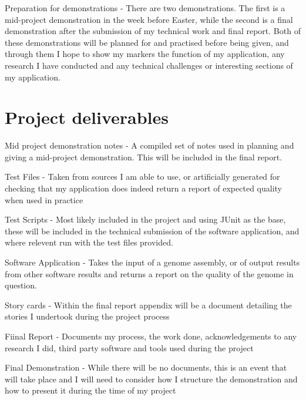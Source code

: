 \documentclass[11pt,fleqn,twoside]{article}
\begin{document}
Preparation for demonstrations - There are two demonstrations. The first is a mid-project demonstration in the week before Easter, while the second is a final demonstration after the submission of my technical work and final report. Both of these demonstrations will be planned for and practised before being given, and through them I hope to show my markers the function of my application, any research I have conducted and any technical challenges or interesting sections of my application. 

\section{Project deliverables}

Mid project demonstration notes - A compiled set of notes used in planning and giving a mid-project demonstration. This will be included in the final report.

Test Files - Taken from sources I am able to use, or artificially generated for checking that my application does indeed return a report of expected quality when used in practice

Test Scripts - Most likely included in the project and using JUnit as the base, these will be included in the technical submission of the software application, and where relevent run with the test files provided.

Software Application - Takes the input of a genome assembly, or of output results from other software results and returns a report on the quality of the genome in question.

Story cards - Within the final report appendix will be a document detailing the stories I undertook during the project process

Fiinal Report -  Documents my process, the work done, acknowledgements to any research I did, third party software and tools used during the project

Final Demonstration - While there will be no documents, this is an event that will take place and I will need to consider how I structure the demonstration and how to present it during the time of my project

%
%
%
\end{document}

